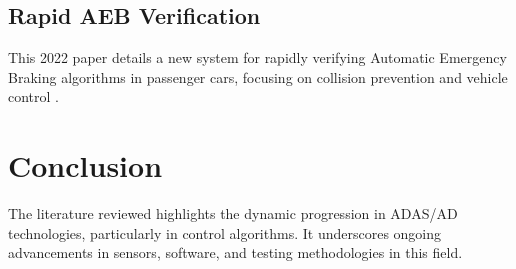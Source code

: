 \documentclass[12pt]{report}
\begin{document}
\section{Rapid AEB Verification}
This 2022 paper details a new system for rapidly verifying Automatic Emergency Braking algorithms in passenger cars, focusing on collision prevention and vehicle control \citep{aebVerification2024}.

\chapter{Conclusion}
The literature reviewed highlights the dynamic progression in ADAS/AD technologies, particularly in control algorithms. It underscores ongoing advancements in sensors, software, and testing methodologies in this field.

\newpage

\end{document}
